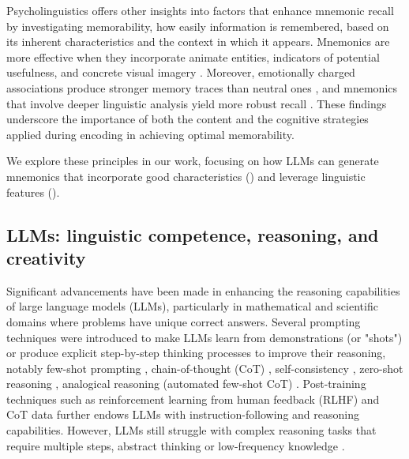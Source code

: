 Psycholinguistics offers other insights into factors that enhance mnemonic recall by investigating memorability, how easily information is remembered, based on its inherent characteristics and the context in which it appears. Mnemonics are more effective when they incorporate animate entities, indicators of potential usefulness, and concrete visual imagery \citep{schwanenflugelContextAvailabilityRecall1992,ledingAdaptiveMemoryAnimacy2019,madanExploringWordMemorability2021}. Moreover, emotionally charged associations produce stronger memory traces than neutral ones \citep{altarribaConcretenessContextAvailability1999}, and mnemonics that involve deeper linguistic analysis yield more robust recall \citep{rankinAgePresentationRate1983, SariogluUSE2024}. These findings underscore the importance of both the content and the cognitive strategies applied during encoding in achieving optimal memorability.

We explore these principles in our work, focusing on how LLMs can generate mnemonics that incorporate good characteristics () and leverage linguistic features ().

\subsection{LLMs: linguistic competence, reasoning, and creativity} \label{sec:llm-linguistic-competence}

Significant advancements have been made in enhancing the reasoning capabilities of large language models (LLMs), particularly in mathematical and scientific domains where problems have unique correct answers. Several prompting techniques were introduced to make LLMs learn from demonstrations (or "shots") or produce explicit step-by-step thinking processes to improve their reasoning, notably few-shot prompting \citep{brownFewShotLearners2020}, chain-of-thought (CoT) \citep{weiChainofThoughtPromptingElicits2022}, self-consistency \citep{wangSelfConsistencyImprovesChain2022}, zero-shot reasoning \citep{kojimaZeroShotReasoners2022}, analogical reasoning (automated few-shot CoT) \citep{YasunagaLLMAnalogicalReasoners2023}. Post-training techniques such as reinforcement learning from human feedback (RLHF) \citep{ouyangRLHF2022} and CoT data \citep{DeepSeek-AIDEEPSEEKR12025} further endows LLMs with instruction-following and reasoning capabilities. However, LLMs still struggle with complex reasoning tasks that require multiple steps, abstract thinking \citep{weiChainofThoughtPromptingElicits2022} or low-frequency knowledge \citep{kandpalLongTailKnowledge2023,sunHeadtoTailHowKnowledgeable2024}.

